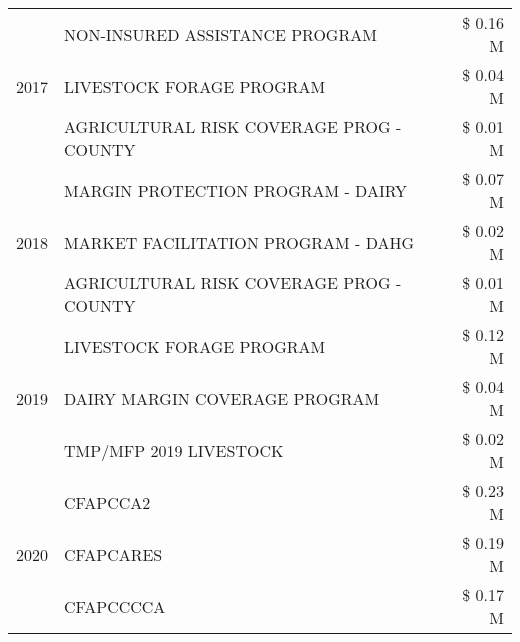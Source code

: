 \begin{tabular}{llr}
\cline{1-3}
\multirow[t]{3}{*}{2017} & NON-INSURED ASSISTANCE PROGRAM & \$ 0.16 M \\
 & LIVESTOCK FORAGE PROGRAM & \$ 0.04 M \\
 & AGRICULTURAL RISK COVERAGE PROG - COUNTY & \$ 0.01 M \\
\cline{1-3}
\multirow[t]{3}{*}{2018} & MARGIN PROTECTION PROGRAM - DAIRY & \$ 0.07 M \\
 & MARKET FACILITATION PROGRAM - DAHG & \$ 0.02 M \\
 & AGRICULTURAL RISK COVERAGE PROG - COUNTY & \$ 0.01 M \\
\cline{1-3}
\multirow[t]{3}{*}{2019} & LIVESTOCK FORAGE PROGRAM & \$ 0.12 M \\
 & DAIRY MARGIN COVERAGE PROGRAM & \$ 0.04 M \\
 & TMP/MFP 2019 LIVESTOCK & \$ 0.02 M \\
\cline{1-3}
\multirow[t]{3}{*}{2020} & CFAPCCA2 & \$ 0.23 M \\
 & CFAPCARES & \$ 0.19 M \\
 & CFAPCCCCA & \$ 0.17 M \\
\cline{1-3}
\bottomrule
\end{tabular}
